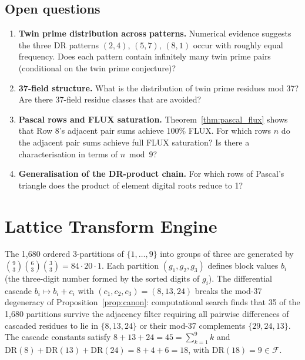 \documentclass[12pt]{article}
\begin{document}
\subsection*{Open questions}

\begin{enumerate}
\item \textbf{Twin prime distribution across patterns.}  Numerical evidence
suggests the three DR patterns $(2,4)$, $(5,7)$, $(8,1)$ occur with
roughly equal frequency.  Does each pattern contain infinitely many twin
prime pairs (conditional on the twin prime conjecture)?

\item \textbf{37-field structure.}  What is the distribution of twin prime
residues mod 37?  Are there 37-field residue classes that are avoided?

\item \textbf{Pascal rows and FLUX saturation.}  Theorem~\ref{thm:pascal_flux}
shows that Row 8's adjacent pair sums achieve 100\% FLUX.  For which rows $n$
do the adjacent pair sums achieve full FLUX saturation?  Is there a
characterisation in terms of $n\bmod 9$?

\item \textbf{Generalisation of the DR-product chain.}  For which rows of
Pascal's triangle does the product of element digital roots reduce to 1?
\end{enumerate}

\appendix
\section{Lattice Transform Engine}
\label{app:lattice}

The 1,680 ordered 3-partitions of $\{1,\ldots,9\}$ into groups of three
are generated by $\binom{9}{3}\binom{6}{3}\binom{3}{3} = 84\cdot20\cdot1$.
Each partition $(g_1,g_2,g_3)$ defines block values $b_i$ (the three-digit
number formed by the sorted digits of $g_i$).  The differential cascade
$b_i \mapsto b_i + c_i$ with $(c_1,c_2,c_3) = (8,13,24)$ breaks the
mod-37 degeneracy of Proposition~\ref{prop:canon}: computational search
finds that 35 of the 1,680 partitions survive the adjacency filter requiring
all pairwise differences of cascaded residues to lie in $\{8,13,24\}$ or
their mod-37 complements $\{29,24,13\}$.  The cascade constants satisfy
$8+13+24 = 45 = \sum_{k=1}^{9} k$ and $\mathrm{DR}(8)+\mathrm{DR}(13)+\mathrm{DR}(24)
= 8+4+6 = 18$, with $\mathrm{DR}(18)=9\in\mathcal{F}$.
\end{document}
